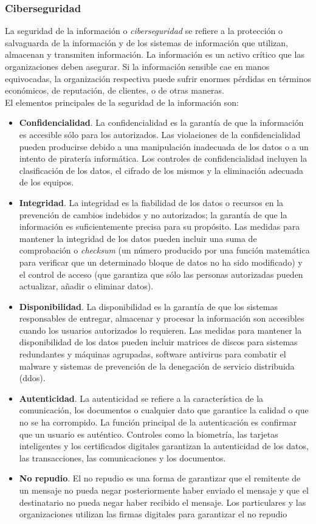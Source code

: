 \subsubsection{Ciberseguridad}
La seguridad de la información o \textit{ciberseguridad} se refiere a la protección o salvaguarda de la información y de los sistemas de información que utilizan, almacenan y transmiten información. La información es un activo crítico que las organizaciones deben asegurar. Si la información sensible cae en manos equivocadas, la organización respectiva puede sufrir enormes pérdidas en términos económicos, de reputación, de clientes, o de otras maneras.\\

El elementos principales de la seguridad de la información son:
\begin{itemize}
    \item \textbf{Confidencialidad}. La confidencialidad es la garantía de que la información es accesible sólo para los autorizados. Las violaciones de la confidencialidad pueden producirse debido a una manipulación inadecuada de los datos o a un intento de piratería informática. Los controles de confidencialidad incluyen la clasificación de los datos, el cifrado de los mismos y la eliminación adecuada de los equipos.
    \item \textbf{Integridad}. La integridad es la fiabilidad de los datos o recursos en la prevención de cambios indebidos y no autorizados; la garantía de que la información es suficientemente precisa para su propósito. Las medidas para mantener la integridad de los datos pueden incluir una suma de comprobación o \textit{checksum} (un número producido por una función matemática para verificar que un determinado bloque de datos no ha sido modificado) y el control de acceso (que garantiza que sólo las personas autorizadas pueden actualizar, añadir o eliminar datos).
    \item \textbf{Disponibilidad}. La disponibilidad es la garantía de que los sistemas responsables de entregar, almacenar y procesar la información son accesibles cuando los usuarios autorizados lo requieren. Las medidas para mantener la disponibilidad de los datos pueden incluir matrices de discos para sistemas redundantes y máquinas agrupadas, software antivirus para combatir el malware y sistemas de prevención de la denegación de servicio distribuida (\acrshort{ddos}).
    \item \textbf{Autenticidad}. La autenticidad se refiere a la característica de la comunicación, los documentos o cualquier dato que garantice la calidad o que no se ha corrompido. La función principal de la autenticación es confirmar que un usuario es auténtico. Controles como la biometría, las tarjetas inteligentes y los certificados digitales garantizan la autenticidad de los datos, las transacciones, las comunicaciones y los documentos.
    \item \textbf{No repudio}. El no repudio es una forma de garantizar que el remitente de un mensaje no pueda negar posteriormente haber enviado el mensaje y que el destinatario no pueda negar haber recibido el mensaje. Los particulares y las organizaciones utilizan las firmas digitales para garantizar el no repudio
\end{itemize}

